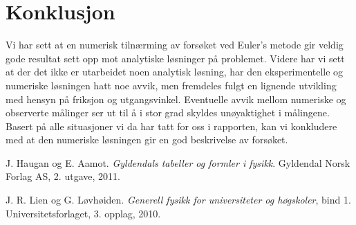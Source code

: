 \documentclass[5p]{elsarticle}
\begin{document}
	\section{Konklusjon}
	Vi har sett at en numerisk tilnærming av forsøket ved Euler's metode gir veldig gode resultat sett opp mot analytiske løsninger på problemet. Videre har vi sett at der det ikke er utarbeidet noen analytisk løsning, har den eksperimentelle og numeriske løsningen hatt noe avvik, men fremdeles fulgt en lignende utvikling med hensyn på friksjon og utgangsvinkel. Eventuelle avvik mellom numeriske og observerte målinger ser ut til å i stor grad skyldes unøyaktighet i målingene. Basert på alle situasjoner vi da har tatt for oss i rapporten, kan vi konkludere med at den numeriske løsningen gir en god beskrivelse av forsøket.
	
	
	\begin{thebibliography}{99}	%
		
		J. Haugan og E. Aamot. \textit{Gyldendals tabeller og formler i fysikk}. Gyldendal Norsk Forlag AS, 2. utgave, 2011.
		
		J. R. Lien og G. Løvhøiden. \textit{Generell fysikk for universiteter og høgskoler}, bind 1. Universitetsforlaget, 3. opplag, 2010.
		
	\end{thebibliography}
	
\end{document}
